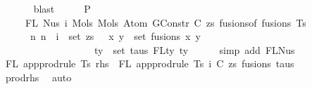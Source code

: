 \begin{isabellebody}
\ \ \ \ \ \isamarkupfalse%
\ blast\isanewline
\ \ \isamarkupfalse%
\ \isamarkupfalse%
\ P{}{}{\isacharcolon}{\kern0pt}\isanewline
\ \ \ \ \ {\isachardoublequoteopen}FL\ {\isacharparenleft}{\kern0pt}Nus{}\ i\ {\isacharparenleft}{\kern0pt}Mols{}\ {\isacharparenleft}{\kern0pt}Mols{}\ {\isacharparenleft}{\kern0pt}Atom\ {\isacharparenleft}{\kern0pt}GConstr\ C{\isacharparenright}{\kern0pt}\ zs{\isacharparenright}{\kern0pt}\ {\isacharparenleft}{\kern0pt}fusions{\isacharunderscore}{\kern0pt}of\ fusions{\isacharparenright}{\kern0pt}{\isacharparenright}{\kern0pt}\ Ts{\isacharparenright}{\kern0pt}{\isacharparenright}{\kern0pt}\ {\isacharequal}{\kern0pt}\isanewline
\ \ \ \ \ \ {\isacharbraceleft}{\kern0pt}n{\isachardot}{\kern0pt}\ n\ {\isacharplus}{\kern0pt}\ i\ {\isasymin}\ set\ zs\ {\isasymunion}\ {\isacharparenleft}{\kern0pt}{\isasymUnion}\ {\isacharparenleft}{\kern0pt}x{\isacharcomma}{\kern0pt}\ y{\isacharparenright}{\kern0pt}\ {\isasymin}\ set\ fusions{\isachardot}{\kern0pt}\ {\isacharbraceleft}{\kern0pt}x{\isacharcomma}{\kern0pt}\ y{\isacharbraceright}{\kern0pt}{\isacharparenright}{\kern0pt}\isanewline
\ \ \ \ \ \ \ \ \ \ \ \ \ \ \ \ \ {\isasymunion}\ {\isacharparenleft}{\kern0pt}{\isasymUnion}\ ty\ {\isasymin}\ set\ taus{\isachardot}{\kern0pt}\ FLty\ ty{\isacharparenright}{\kern0pt}{\isacharbraceright}{\kern0pt}{\isachardoublequoteclose}\isanewline
\ \ \ \ \isamarkupfalse%
\ {\isacharparenleft}{\kern0pt}simp\ add{\isacharcolon}{\kern0pt}\ FL{\isacharunderscore}{\kern0pt}Nus{}{\isacharparenright}{\kern0pt}\isanewline
\isanewline
\isanewline
\ \ \isamarkupfalse%
\ {\isachardoublequoteopen}FL\ {\isacharparenleft}{\kern0pt}app{\isacharunderscore}{\kern0pt}prodrule\ Ts\ rhs{\isacharparenright}{\kern0pt}\ {\isacharequal}{\kern0pt}\ FL\ {\isacharparenleft}{\kern0pt}app{\isacharunderscore}{\kern0pt}prodrule\ Ts\ {\isacharparenleft}{\kern0pt}i{\isacharcomma}{\kern0pt}\ {\isacharparenleft}{\kern0pt}C{\isacharcomma}{\kern0pt}\ zs{\isacharparenright}{\kern0pt}{\isacharcomma}{\kern0pt}\ fusions{\isacharcomma}{\kern0pt}\ taus{\isacharparenright}{\kern0pt}{\isacharparenright}{\kern0pt}{\isachardoublequoteclose}\isanewline
\ \ \ \ \isamarkupfalse%
\ prod{\isacharunderscore}{\kern0pt}rhs{}\ \isamarkupfalse%
\ auto\isanewline
\ \ \isamarkupfalse%
\ \isamarkupfalse%
\ {\isachardoublequoteopen}{\isachardot}{\kern0pt}{\isachardot}{\kern0pt}{\isachardot}{\kern0pt}\ {\isacharequal}{\kern0pt}\isanewline

\end{isabellebody}
